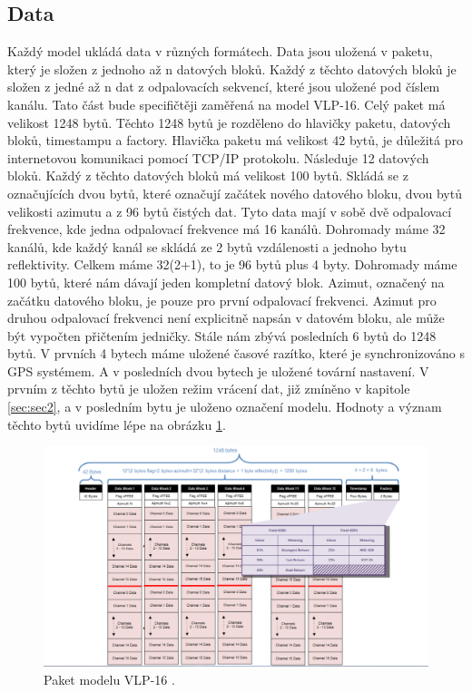 \documentclass[czech,bachelor,dept420,male,cpdeclaration]{diploma}
\begin{document}


\subsection{Data}\label{secref:secref1}
Každý model ukládá data v různých formátech. Data jsou uložená v paketu, který je složen z jednoho až n datových bloků. Každý z těchto datových bloků je složen z jedné až n dat z odpalovacích sekvencí, které jsou uložené pod číslem kanálu. Tato část bude specifičtěji zaměřená na model VLP-16. Celý paket má velikost \num{1248} bytů. Těchto \num{1248} bytů je rozděleno do hlavičky paketu, datových bloků, timestampu a factory. Hlavička paketu má velikost \num{42} bytů, je důležitá pro internetovou komunikaci pomocí TCP/IP protokolu. Následuje \num{12} datových bloků. Každý z těchto datových bloků má velikost \num{100} bytů. Skládá se z označujících dvou bytů, které označují začátek nového datového bloku, dvou bytů velikosti azimutu a z \num{96} bytů čistých dat. Tyto data mají v sobě dvě odpalovací frekvence, kde jedna odpalovací frekvence má \num{16} kanálů. Dohromady máme \num{32} kanálů, kde každý kanál se skládá ze \num{2} bytů vzdálenosti a jednoho bytu reflektivity. Celkem máme 32(2+1), to je \num{96} bytů plus \num{4} byty. Dohromady máme \num{100} bytů, které nám dávají jeden kompletní datový blok. Azimut, označený na začátku datového bloku, je pouze pro první odpalovací frekvenci. Azimut pro druhou odpalovací frekvenci není explicitně napsán v datovém bloku, ale může být vypočten přičtením jedničky. Stále nám zbývá posledních 6 bytů do \num{1248} bytů. V prvních \num{4} bytech máme uložené časové razítko, které je synchronizováno s GPS systémem. A v posledních dvou bytech je uložené tovární nastavení. V prvním z těchto bytů je uložen režim vrácení dat, již zmíněno v kapitole \ref{sec:sec2}, a v posledním bytu je uloženo označení modelu. Hodnoty a význam těchto bytů uvidíme lépe na obrázku \ref{fig:packet}.

\begin{figure}[H]
\includegraphics[width=\linewidth]{Figures/packet.png}
\caption{ Paket modelu VLP-16 \cite{packet}. }
\label{fig:packet}
\end{figure}
\end{document}
